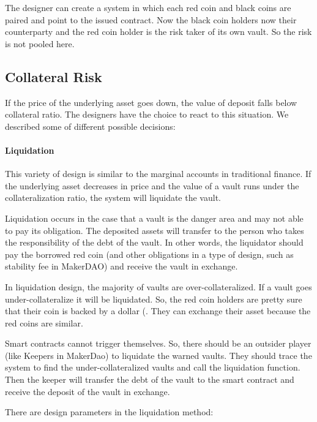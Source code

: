 \documentclass[runningheads]{llncs}
\begin{document}
The designer can create a system in which each red coin and black coins are paired and point to the issued contract. Now the black coin holders now their counterparty and the red coin holder is the risk taker of its own vault. So the risk is not pooled here.
\subsection{Collateral Risk}
If the price of the underlying asset goes down, the value of deposit falls below collateral ratio. The designers have the choice to react to this situation. We described some of different possible decisions:

\paragraph{Liquidation}
This variety of design is similar to the marginal accounts in traditional finance. If the underlying asset decreases in price and the value of a vault runs under the collateralization ratio, the system will liquidate the vault.

Liquidation occurs in the case that a vault is the danger area and may not able to pay its obligation. The deposited assets will transfer to the person who takes the responsibility of the debt of the vault. In other words, the liquidator should pay the borrowed red coin (and other obligations in a type of design, such as stability fee in MakerDAO) and receive the vault in exchange.


In liquidation design, the majority of vaults are over-collateralized. If a vault goes under-collateralize it will be liquidated. So, the red coin holders are pretty sure that their coin is backed by a dollar (. They can exchange their asset because the red coins are similar.

Smart contracts cannot trigger themselves. So, there should be an outsider player (like Keepers in MakerDao) to liquidate the warned vaults. They should trace the system to find the under-collateralized vaults and call the liquidation function. Then the keeper will transfer the debt of the vault to the smart contract and receive the deposit of the vault in exchange.

There are design parameters in the liquidation method:
\end{document}
